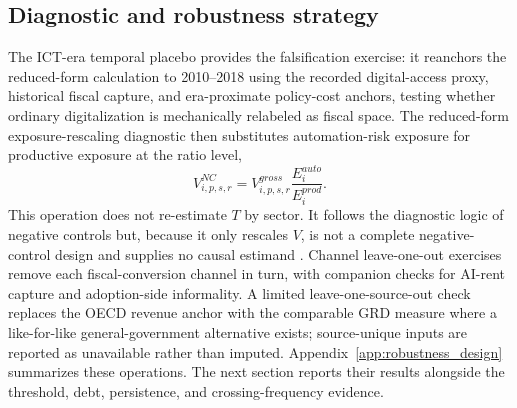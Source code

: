 \subsection{Diagnostic and robustness strategy}\label{subsec:diagnostics_design_clean}

The ICT-era temporal placebo provides the falsification exercise: it reanchors the reduced-form calculation to 2010--2018 using the recorded digital-access proxy, historical fiscal capture, and era-proximate policy-cost anchors, testing whether ordinary digitalization is mechanically relabeled as fiscal space. The reduced-form exposure-rescaling diagnostic then substitutes automation-risk exposure for productive exposure at the ratio level,
\begin{equation}
  V^{NC}_{i,p,s,r}
  =V^{gross}_{i,p,s,r}\frac{E^{auto}_{i}}{E^{prod}_{i}}.
  \label{eq:negative_control_clean}
\end{equation}
This operation does not re-estimate $T$ by sector. It follows the diagnostic logic of negative controls but, because it only rescales $V$, is not a complete negative-control design and supplies no causal estimand \citep{lipsitch2010negative}. Channel leave-one-out exercises remove each fiscal-conversion channel in turn, with companion checks for AI-rent capture and adoption-side informality. A limited leave-one-source-out check replaces the OECD revenue anchor with the comparable GRD measure where a like-for-like general-government alternative exists; source-unique inputs are reported as unavailable rather than imputed. Appendix~\ref{app:robustness_design} summarizes these operations. The next section reports their results alongside the threshold, debt, persistence, and crossing-frequency evidence.
